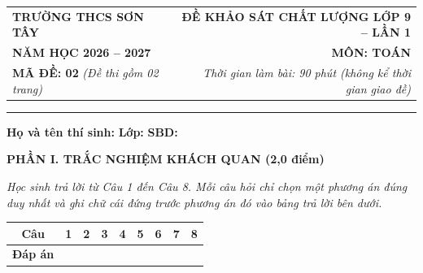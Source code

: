\documentclass[12pt,a4paper]{article}
\begin{document}
\noindent
\begin{tabularx}{\linewidth}{X r}
  \textbf{TRƯỜNG THCS SƠN TÂY} & \textbf{ĐỀ KHẢO SÁT CHẤT LƯỢNG LỚP 9 -- LẦN 1} \\
  \textbf{NĂM HỌC 2026 -- 2027} & \textbf{MÔN: TOÁN} \\
  \textbf{MÃ ĐỀ: 02} \textit{(Đề thi gồm 02 trang)} & \textit{Thời gian làm bài: 90 phút (không kể thời gian giao đề)} \\
\end{tabularx}
\vspace{-1mm}
\hrule
\vspace{2mm}

\noindent\textbf{Họ và tên thí sinh:} \dotfill \textbf{Lớp:} \dotfill \textbf{SBD:} \dotfill

\vspace{2mm}
\noindent\textbf{\large PHẦN I. TRẮC NGHIỆM KHÁCH QUAN (2,0 điểm)}

\noindent\textit{Học sinh trả lời từ Câu 1 đến Câu 8. Mỗi câu hỏi chỉ chọn một phương án đúng duy nhất và ghi chữ cái đứng trước phương án đó vào bảng trả lời bên dưới.}

\vspace{1.5mm}
\begin{center}
\renewcommand{\arraystretch}{1.25}
\begin{tabular}{|c|c|c|c|c|c|c|c|c|}
\hline
\textbf{Câu} & \textbf{1} & \textbf{2} & \textbf{3} & \textbf{4} & \textbf{5} & \textbf{6} & \textbf{7} & \textbf{8} \\
\hline
\textbf{Đáp án} & \hspace{1.1cm} & \hspace{1.1cm} & \hspace{1.1cm} & \hspace{1.1cm} & \hspace{1.1cm} & \hspace{1.1cm} & \hspace{1.1cm} & \hspace{1.1cm} \\
\hline
\end{tabular}
\end{center}
\vspace{1.5mm}
\end{document}
